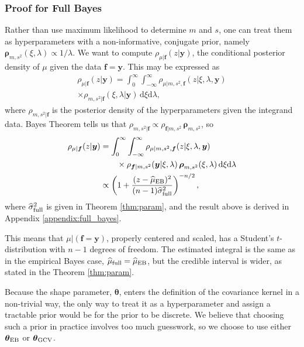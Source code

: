 \documentclass[twocolumn]{svjour3}          %
\newcommand{\bm}[1]{\boldsymbol{#1}}
\newcommand{\D}[1]{\text{d}{#1}}
\newcommand{\vtheta}{{\bm{\theta}}}
\newcommand{\vf}{\bm{f}}
\newcommand{\vrho}{\bm{\rho}}
\newcommand{\vy}{\bm{y}}
\newcommand{\hmu}{\widehat{\mu}}
\newcommand{\hsigma}{\widehat{\sigma}}
\newcommand{\MLE}{\textup{EB}}
\newcommand{\GCV}{\textup{GCV}}
\begin{document}
\subsubsection{Proof for Full Bayes} \label{sec:fullBayes}
Rather than use maximum likelihood to determine $m$ and $s$,  one can treat them as hyperparameters with a non-informative, conjugate prior, namely $\vrho_{m,s^2}(\xi, \lambda) \propto 1/\lambda$. We want to compute $\rho_{\mu|\vf}(z | \vy)$, the conditional posterior density of $\mu$ given the data $\vf = \vy$.  This may be expressed as 
\begin{multline*}
    \rho_{\mu|\vf}(z | \vy) 
= \int_{0}^\infty \int_{-\infty}^\infty 
\rho_{\mu | m, s^2, \vf}(z | \xi, \lambda , \vy) \\
\times  \rho_{m, s^2 | \vf}(\xi, \lambda | \vy)  \, \D \xi \D \lambda, 
\end{multline*}
where $\rho_{m, s^2 | \vf}$ is the posterior density of the hyperparameters given the integrand data. Bayes Theorem tells us that $\rho_{m, s^2 | \vf} \propto \rho_{\vf | m, s^2} \, \vrho_{m,s^2}$, so 
\begin{align}
\nonumber 
    \rho_{\mu|\vf}(z | \vy) 
& = \int_{0}^\infty \int_{-\infty}^\infty 
\rho_{\mu | m, s^2, \vf}(z | \xi, \lambda , \vy) \\
\nonumber
& \qquad \times  \rho_{\vf | m, s^2} (\vy | \xi, \lambda) \, \vrho_{m,s^2}(\xi,\lambda)  \, \D \xi \D \lambda \\
\nonumber
& \propto \left( 1 +  \frac{(z - \hmu_{\MLE})^2}{(n-1) \hsigma_{\textup{full}}^2} \right)^{-n/2},
\end{align}
where $\hsigma_{\textup{full}}^2$ is given in Theorem \ref{thm:param}, and the result above is derived in Appendix \ref{appendix:full_bayes}.

This means that $\mu \vert (\vf = \vy )$, properly centered and scaled, has a Student's $t$-distribution with $n-1$ degrees of freedom.   The estimated integral is the same as in the empirical Bayes case, $\hmu_{\textup{full}} = \hmu_{\MLE}$, but the credible interval is wider, as stated in the Theorem \ref{thm:param}.

Because the shape parameter, $\vtheta$, enters the definition of the covariance kernel in a non-trivial way, the only way to treat it as a hyperparameter and assign a tractable prior would be for the prior to be discrete.  We believe that choosing such a prior in practice involves too much guesswork, so we choose to use either $\vtheta_\MLE$ or $\vtheta_\GCV$.
\end{document}
